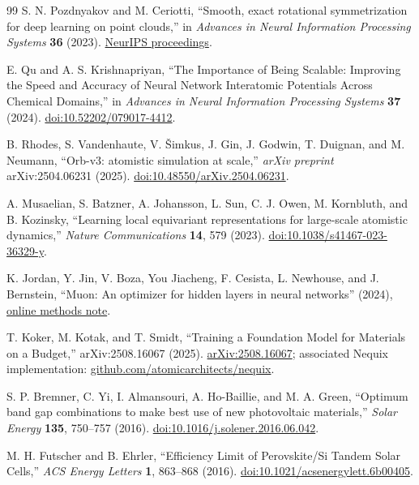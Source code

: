 \documentclass[aps,prx,preprint,notitlepage,superscriptaddress,nofootinbib,floatfix]{revtex4-2}
\newif\ifshowrevisions
\newcommand{\drafteleven}[1]{%
  \ifshowrevisions\textcolor{draftelevencolor}{#1}\else#1\fi}
\newcommand{\draftnineteen}[1]{%
  \ifshowrevisions\textcolor{draftnineteencolor}{#1}\else#1\fi}
\newcommand{\drafttwenty}[1]{%
  \ifshowrevisions\textcolor{drafttwentycolor}{#1}\else#1\fi}
\begin{document}
\begin{thebibliography}{99}
S. N. Pozdnyakov and M. Ceriotti,
``Smooth, exact rotational symmetrization for deep learning on point clouds,''
in \emph{Advances in Neural Information Processing Systems} \textbf{36}
(2023).
\href{https://proceedings.neurips.cc/paper/2023/hash/fb4a7e3522363907b26a86cc5be627ac-Abstract.html}{NeurIPS proceedings}.

E. Qu and A. S. Krishnapriyan,
``The Importance of Being Scalable: Improving the Speed and Accuracy of Neural
Network Interatomic Potentials Across Chemical Domains,'' in
\emph{Advances in Neural Information Processing Systems} \textbf{37} (2024).
\href{https://doi.org/10.52202/079017-4412}{doi:10.52202/079017-4412}.

B. Rhodes, S. Vandenhaute, V. \v{S}imkus, J. Gin, J. Godwin, T. Duignan, and M. Neumann,
``Orb-v3: atomistic simulation at scale,''
\emph{arXiv preprint} arXiv:2504.06231 (2025).
\href{https://doi.org/10.48550/arXiv.2504.06231}{doi:10.48550/arXiv.2504.06231}.

A. Musaelian, S. Batzner, A. Johansson, L. Sun, C. J. Owen,
M. Kornbluth, and B. Kozinsky,
``Learning local equivariant representations for large-scale atomistic
dynamics,'' \emph{Nature Communications} \textbf{14}, 579 (2023).
\href{https://doi.org/10.1038/s41467-023-36329-y}{doi:10.1038/s41467-023-36329-y}.

K. Jordan, Y. Jin, V. Boza, You Jiacheng, F. Cesista, L. Newhouse, and
J. Bernstein,
``Muon: An optimizer for hidden layers in neural networks'' (2024),
\href{https://kellerjordan.github.io/posts/muon/}{online methods note}.

\drafteleven{T. Koker, M. Kotak, and T. Smidt,
``Training a Foundation Model for Materials on a Budget,''
arXiv:2508.16067 (2025).
\href{https://arxiv.org/abs/2508.16067}{arXiv:2508.16067}; associated Nequix
implementation:
\href{https://github.com/atomicarchitects/nequix}{github.com/atomicarchitects/nequix}.}

\drafttwenty{S. P. Bremner, C. Yi, I. Almansouri, A. Ho-Baillie, and M. A. Green,
``Optimum band gap combinations to make best use of new photovoltaic
materials,'' \emph{Solar Energy} \textbf{135}, 750--757 (2016).
\href{https://doi.org/10.1016/j.solener.2016.06.042}{doi:10.1016/j.solener.2016.06.042}.}

\draftnineteen{M. H. Futscher and B. Ehrler,
``Efficiency Limit of Perovskite/Si Tandem Solar Cells,''
\emph{ACS Energy Letters} \textbf{1}, 863--868 (2016).
\href{https://doi.org/10.1021/acsenergylett.6b00405}{doi:10.1021/acsenergylett.6b00405}.}


\end{thebibliography}
\end{document}
